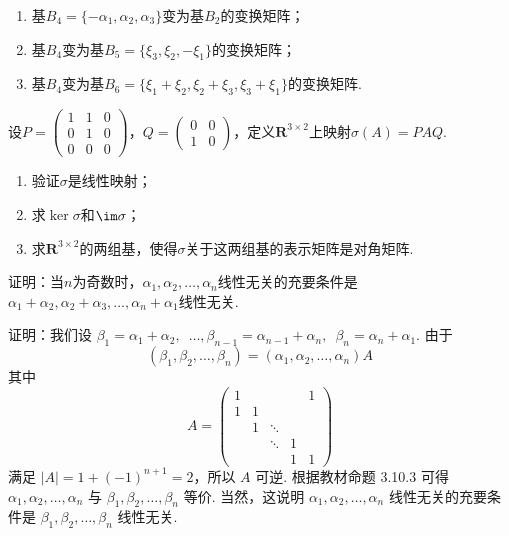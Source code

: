 \begin{exercise}
\begin{exgroup}
\begin{enumerate}
            \item 基$B_4=\{-\alpha_1,\alpha_2,\alpha_3\}$变为基$B_2$的变换矩阵；

            \item 基$B_4$变为基$B_5=\{\xi_3,\xi_2,-\xi_1\}$的变换矩阵；

            \item 基$B_4$变为基$B_6=\{\xi_1+\xi_2,\xi_2+\xi_3,\xi_3+\xi_1\}$的变换矩阵.
        \end{enumerate}


        \item 设$P=\begin{pmatrix}
                1 & 1 & 0 \\ 0 & 1 & 0 \\ 0 & 0 & 0
            \end{pmatrix}$，$Q=\begin{pmatrix}
                0 & 0 \\ 1 & 0
            \end{pmatrix}$，定义$\mathbf{R}^{3\times 2}$上映射$\sigma(A)=PAQ$.
        \begin{enumerate}
            \item 验证$\sigma$是线性映射；

            \item 求$\ker\sigma$和$\im \sigma$；

            \item 求$\mathbf{R}^{3\times 2}$的两组基，使得$\sigma$关于这两组基的表示矩阵是对角矩阵.
        \end{enumerate}

        \item 证明：当$n$为奇数时，$\alpha_1,\alpha_2,\ldots,\alpha_n$线性无关的充要条件是$\alpha_1+\alpha_2,\alpha_2+\alpha_3,\ldots,\alpha_n+\alpha_1$线性无关.
        \begin{answer}
            证明：我们设 $ \beta_1 = \alpha_1 + \alpha_2,\enspace \ldots, \beta_{n - 1} = \alpha_{n - 1} + \alpha_n,\enspace \beta_n = \alpha_n + \alpha_1 $. 由于
            \[ (\beta_1, \beta_2, \ldots, \beta_n) = (\alpha_1, \alpha_2, \ldots, \alpha_n) A \]
            其中
            \[ A = \begin{pmatrix}
                    1 &   &        &   & 1 \\
                    1 & 1 &        &   &   \\
                        & 1 & \ddots &   &   \\
                        &   & \ddots & 1 &   \\
                        &   &        & 1 & 1
                \end{pmatrix} \]
            满足 $ |A| = 1 + (-1)^{n + 1} = 2 $，所以 $ A $ 可逆. 根据教材命题 3.10.3 可得 $ \alpha_1, \alpha_2, \ldots, \alpha_n $ 与 $ \beta_1, \beta_2, \ldots, \beta_n $ 等价. 当然，这说明 $ \alpha_1, \alpha_2, \ldots, \alpha_n $ 线性无关的充要条件是 $ \beta_1, \beta_2, \ldots, \beta_n $ 线性无关.
        \end{answer}


\end{exgroup}
\end{exercise}

